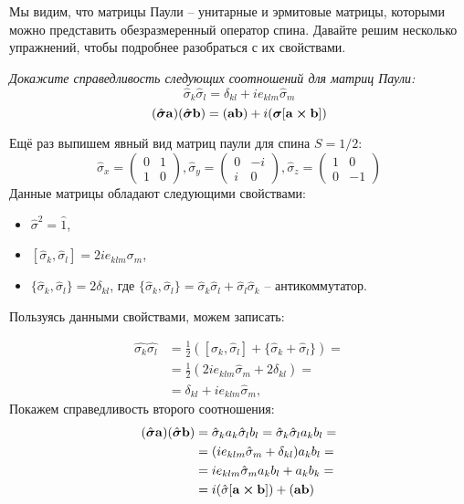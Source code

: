 Мы видим, что матрицы Паули -- унитарные и эрмитовые матрицы, которыми можно представить обезразмеренный оператор спина. Давайте решим несколько упражнений, чтобы подробнее разобраться с их свойствами.
\begin{center}
    \textit{Докажите справедливость следующих соотношений для матриц Паули:}
    \[
    \hat{\sigma}_k\hat{\sigma}_l = \delta_{kl} + ie_{klm}\hat{\sigma}_m
    \]
    \[
    (\hat{\boldsymbol{\sigma}}\mathbf{a})(\hat{\boldsymbol{\sigma}}\mathbf{b}) = (\mathbf{ab}) + i(\boldsymbol{\sigma}[\mathbf{a} \cross \mathbf{b}])
    \]
\end{center}

Ещё раз выпишем явный вид матриц паули для спина $S=1/2$:
\[
    \hat{\sigma}_x = \left(\begin{array}{cc}
        0 & 1 \\
        1 & 0
    \end{array}
    \right), 
    \hat{\sigma}_y = \left(\begin{array}{cc}
        0 & -i \\
        i & 0
    \end{array}
    \right),
    \hat{\sigma}_z = \left(\begin{array}{cc}
        1 & 0 \\
        0 & -1
    \end{array}
    \right)
\]
Данные матрицы обладают следующими свойствами:
\begin{itemize}
    \item $\hat{\sigma}^2 = \hat{1}$,
    \item $[\hat{\sigma}_k, \hat{\sigma}_l] = 2ie_{klm}\sigma_m$,
    \item $\{\hat{\sigma}_k, \hat{\sigma}_l\} = 2\delta_{kl}$, где $\{\hat{\sigma}_k, \hat{\sigma}_l\} = \hat{\sigma}_k\hat{\sigma}_l + \hat{\sigma}_l\hat{\sigma}_k$ -- антикоммутатор.
\end{itemize}
Пользуясь данными свойствами, можем записать:

\begin{align*}
\hat{\sigma_k}\hat{\sigma_l} &= \frac{1}{2}([\hat{\sigma}_k, \hat{\sigma}_l] + \{\hat{\sigma}_k + \hat{\sigma}_l\}) = \\ 
&= \frac{1}{2}(2ie_{klm}\hat{\sigma}_m + 2\delta_{kl}) =\\
&= \delta_{kl} + ie_{klm}\hat{\sigma}_m,
\end{align*}
Покажем справедливость второго соотношения:
\begin{align*}
(\hat{\boldsymbol{\sigma}}\mathbf{a})(\hat{\boldsymbol{\sigma}}\mathbf{b}) &= \hat{\sigma}_ka_k\hat{\sigma}_lb_l = \hat{\sigma}_k\hat{\sigma}_la_kb_l=\\
&= (ie_{klm}\hat{\sigma}_m + \delta_{kl})a_kb_l =\\
&= ie_{klm}\hat{\sigma}_m a_k b_l + a_k b_k =\\
&= i(\hat{\sigma}[\mathbf{a}\cross\mathbf{b}]) + (\mathbf{a}\mathbf{b})
\end{align*}


